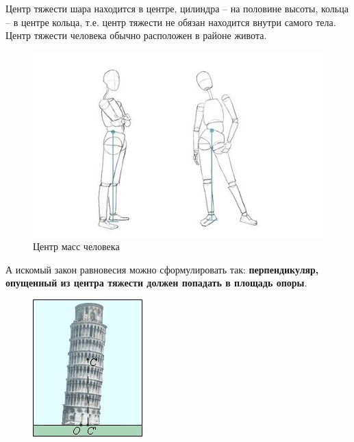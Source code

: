 Центр тяжести шара находится в центре, цилиндра – на половине высоты, кольца – в центре кольца, т.е. центр тяжести не обязан находится внутри самого тела. Центр тяжести человека обычно расположен в районе живота.
\begin{figure}[h!]
	\begin{center}
		\includegraphics[width=1\linewidth]{chapters/chapter8/images/4}
		\caption{Центр масс человека}
		\label{ris:image8x4}
	\end{center}
\end{figure}	 

А искомый закон равновесия можно сформулировать так: {\bfseries перпендикуляр, опущенный из центра тяжести должен попадать в площадь опоры}. 
\begin{figure}[h!]
	\begin{center}
		\includegraphics[width=0.45\linewidth]{chapters/chapter8/images/5}
		\caption{}
		\label{ris:image8x5}
	\end{center}
\end{figure}

